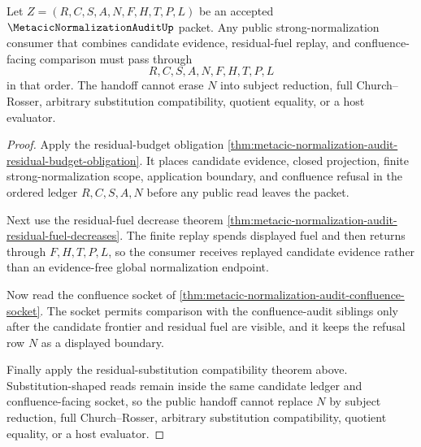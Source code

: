 \begin{theorem}
\label{thm:metacic-normalization-audit-candidate-residual-replay-handoff}
Let $Z=(R,C,S,A,N,F,H,T,P,L)$ be an accepted $\MetacicNormalizationAuditUp$ packet. Any public strong-normalization consumer that combines candidate evidence, residual-fuel replay, and confluence-facing comparison must pass through
$$
R,C,S,A,N,F,H,T,P,L
$$
in that order. The handoff cannot erase $N$ into subject reduction, full Church--Rosser, arbitrary substitution compatibility, quotient equality, or a host evaluator.
\end{theorem}
\begin{proof}
Apply the residual-budget obligation \autoref{thm:metacic-normalization-audit-residual-budget-obligation}. It places candidate evidence, closed projection, finite strong-normalization scope, application boundary, and confluence refusal in the ordered ledger $R,C,S,A,N$ before any public read leaves the packet.

Next use the residual-fuel decrease theorem \autoref{thm:metacic-normalization-audit-residual-fuel-decreases}. The finite replay spends displayed fuel and then returns through $F,H,T,P,L$, so the consumer receives replayed candidate evidence rather than an evidence-free global normalization endpoint.

Now read the confluence socket of \autoref{thm:metacic-normalization-audit-confluence-socket}. The socket permits comparison with the confluence-audit siblings only after the candidate frontier and residual fuel are visible, and it keeps the refusal row $N$ as a displayed boundary.

Finally apply the residual-substitution compatibility theorem above. Substitution-shaped reads remain inside the same candidate ledger and confluence-facing socket, so the public handoff cannot replace $N$ by subject reduction, full Church--Rosser, arbitrary substitution compatibility, quotient equality, or a host evaluator.
\end{proof}

